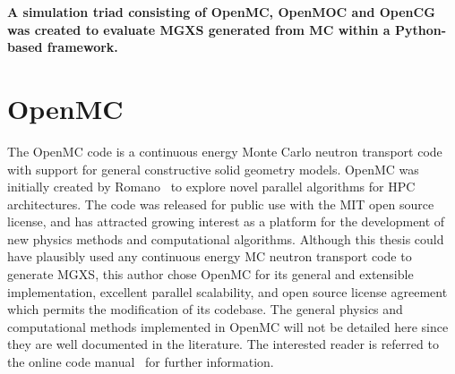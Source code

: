   

\begin{emphbox}
\textbf{A simulation triad consisting of OpenMC, OpenMOC and OpenCG was created to evaluate \ac{MGXS} generated from \ac{MC} within a Python-based framework.}
\end{emphbox}


\section{OpenMC}
\label{sec:chap4-openmc}

The OpenMC code is a continuous energy Monte Carlo neutron transport code~\cite{romano2013openmc} with support for general constructive solid geometry models. OpenMC was initially created by Romano~\cite{romano2013parallel} to explore novel parallel algorithms for \ac{HPC} architectures. The code was released for public use with the MIT open source license, and has attracted growing interest as a platform for the development of new physics methods and computational algorithms. Although this thesis could have plausibly used any continuous energy \ac{MC} neutron transport code to generate \ac{MGXS}, this author chose OpenMC for its general and extensible implementation, excellent parallel scalability, and open source license agreement which permits the modification of its codebase. The general physics and computational methods implemented in OpenMC will not be detailed here since they are well documented in the literature. The interested reader is referred to the online code manual~\cite{openmc2016manual} for further information.

